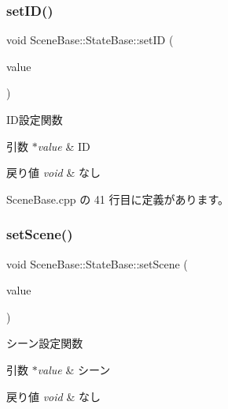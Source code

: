 \subsubsection{\texorpdfstring{set\+I\+D()}{setID()}}
{\footnotesize\ttfamily void Scene\+Base\+::\+State\+Base\+::set\+ID (\begin{DoxyParamCaption}\item[{int}]{value }\end{DoxyParamCaption})}



I\+D設定関数 


\begin{DoxyParams}{引数}
{\em $\ast$value} & ID \\
\hline
\end{DoxyParams}

\begin{DoxyRetVals}{戻り値}
{\em void} & なし \\
\hline
\end{DoxyRetVals}


 Scene\+Base.\+cpp の 41 行目に定義があります。

\mbox{\label{class_scene_base_1_1_state_base_adfb19da59b938832387aa10528bedb44}} 
\subsubsection{\texorpdfstring{set\+Scene()}{setScene()}}
{\footnotesize\ttfamily void Scene\+Base\+::\+State\+Base\+::set\+Scene (\begin{DoxyParamCaption}\item[{\mbox{\hyperlink{class_scene_base}{Scene\+Base}} $\ast$}]{value }\end{DoxyParamCaption})}



シーン設定関数 


\begin{DoxyParams}{引数}
{\em $\ast$value} & シーン \\
\hline
\end{DoxyParams}

\begin{DoxyRetVals}{戻り値}
{\em void} & なし \\
\hline
\end{DoxyRetVals}


